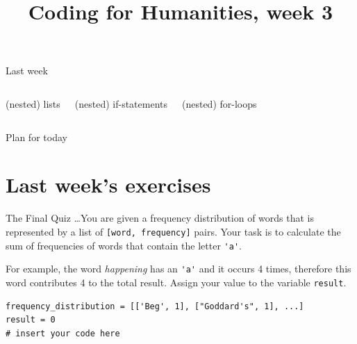\documentclass[aspectratio=169,usenames,dvipsnames]{beamer}
\title{Coding for Humanities, week 3}
\begin{document}
\begin{frame}
 \titlepage
\end{frame}

\begin{frame}{Last week}
\begin{columns}[T]
    \Large
    (nested) lists

    \vspace{1em}
    (nested) if-statements 

    \vspace{1em}
    (nested) for-loops
\end{columns}
\end{frame}

\begin{frame}{Plan for today}
 \tableofcontents
\end{frame}

\section{Last week's exercises}
\begin{frame}[fragile]{The Final Quiz}
\dots You are given a frequency distribution of words that is represented by a
list of \lstinline{[word, frequency]} pairs. Your task is to calculate the sum
of frequencies of words that contain the letter \lstinline{'a'}.
    
For example, the word \emph{happening} has an \lstinline{'a'} and it occurs
4 times, therefore this word contributes 4 to the total result. Assign your
value to the variable \lstinline{result}.

\begin{lstlisting}
frequency_distribution = [['Beg', 1], ["Goddard's", 1], ...]
result = 0
# insert your code here
\end{lstlisting}
\end{frame}
\end{document}
